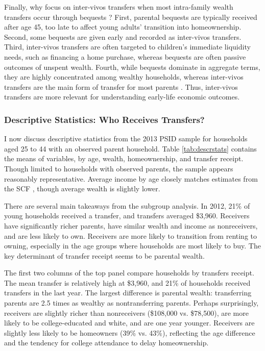 \documentclass[12pt]{article}
\begin{document}
Finally, why focus on inter-vivos transfers when most intra-family wealth transfers occur through bequests \citep[see e.g.,][]{feiveson2019lifecycle}? First, parental bequests are typically received after age 45, too late to affect young adults' transition into homeownership. Second, some bequests are given early and recorded as inter-vivos transfers. Third, inter-vivos transfers are often targeted to children's immediate liquidity needs, such as financing a home purchase, whereas bequests are often passive outcomes of unspent wealth. Fourth, while bequests dominate in aggregate terms, they are highly concentrated among wealthy households, whereas inter-vivos transfers are the main form of transfer for most parents \citep{yang2023financial}. Thus, inter-vivos transfers are more relevant for understanding early-life economic outcomes. 


\subsubsection{Descriptive Statistics: Who Receives Transfers?}
I now discuss descriptive statistics from the 2013 PSID sample for households aged 25 to 44 with an observed parent household. Table \ref{tab:descrstats} contains the means of variables, by age, wealth, homeownership, and transfer receipt. Though limited to households with observed parents, the sample appears reasonably representative. Average income by age closely matches estimates from the SCF \cite[see e.g.,][]{kuhn20162013}, though average wealth is slightly lower.

There are several main takeaways from the subgroup analysis. In 2012, 21\% of young households received a transfer, and transfers averaged \$3,960. Receivers have significantly richer parents, have similar wealth and income as nonreceivers, and are less likely to own. Receivers are more likely to transition from renting to owning, especially in the age groups where households are most likely to buy. The key determinant of transfer receipt seems to be parental wealth.

The first two columns of the top panel compare households by transfers receipt. The mean transfer is relatively high at \$3,960, and 21\% of households received transfers in the last year. The largest difference is parental wealth: transferring parents are 2.5 times as wealthy as nontransferring parents. Perhaps surprisingly, receivers are slightly richer than nonreceivers (\$108,000 vs. \$78,500), are more likely to be college-educated and white, and are one year younger. Receivers are slightly less likely to be homeowners (39\% vs. 43\%), reflecting the age difference and the tendency for college attendance to delay homeownership.
\end{document}
